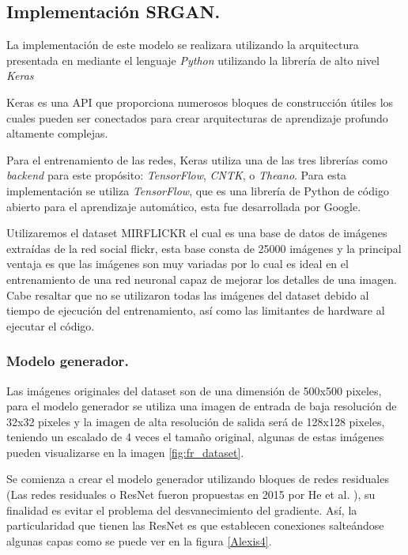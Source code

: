 \subsection{Implementación SRGAN.}

La implementación de este modelo se realizara utilizando la arquitectura presentada
en \cite{SRGAN} mediante el lenguaje \emph{Python} utilizando la librería de alto nivel \emph{Keras}

Keras es una API que proporciona numerosos bloques
de construcción útiles los cuales pueden ser conectados para crear arquitecturas de
aprendizaje profundo altamente complejas.

Para el entrenamiento de las redes, Keras utiliza una de las tres librerías como
\emph{backend} para este propósito: \emph{TensorFlow}, \emph{CNTK}, o \emph{Theano}. Para esta implementación
se utiliza \emph{TensorFlow}, que es una librería de Python de código abierto para el
aprendizaje automático, esta fue desarrollada por Google.

Utilizaremos el dataset MIRFLICKR \cite{MIRFLICKR} el cual es una base de datos de imágenes
extraídas de la red social flickr, esta base consta de 25000 imágenes y la principal ventaja es 
que las imágenes son muy variadas por lo cual es ideal en el entrenamiento de una red neuronal capaz 
de mejorar los detalles de una imagen. Cabe resaltar que no se utilizaron todas las imágenes del dataset
debido al tiempo de ejecución del entrenamiento, así como las limitantes de hardware al ejecutar el código.



\subsubsection{Modelo generador.}

Las imágenes originales del dataset son de una dimensión de 500x500 pixeles, para el modelo generador
se utiliza una imagen de entrada de baja resolución de 32x32 pixeles y la imagen de alta resolución de salida
será de 128x128 pixeles, teniendo un escalado de 4 veces el tamaño original, algunas de estas imágenes pueden
visualizarse en la imagen \ref{fig:fr_dataset}.


Se comienza a crear el modelo generador utilizando bloques de
redes residuales (Las redes residuales o ResNet fueron
propuestas en 2015 por He et al. \cite{Resnet}), su finalidad es evitar el problema del desvanecimiento del gradiente. Así, la particularidad
que tienen las ResNet es que establecen conexiones salteándose algunas
capas como se puede ver en la figura \ref{Alexis4}.

